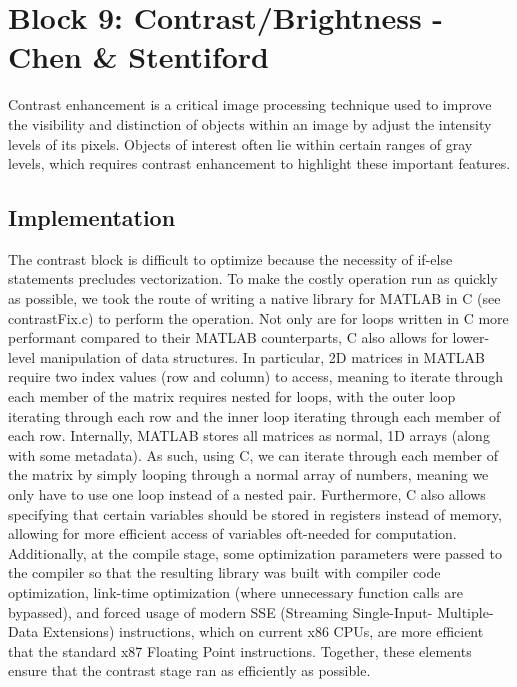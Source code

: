 
\section{Block 9: Contrast/Brightness - Chen \& Stentiford}

Contrast enhancement is a critical image processing technique used to improve the visibility and
distinction of objects within an image by adjust the intensity levels of its pixels. Objects of
interest often lie within certain ranges of gray levels, which requires contrast enhancement to
highlight these important features.


\subsection{Implementation}

The contrast block is difficult to optimize because the necessity of if-else statements precludes 
vectorization. To make the costly operation run as quickly as possible, we took the route of 
writing a native library for MATLAB in C (see contrastFix.c) to perform the operation. Not only 
are for loops written in C more performant compared to their MATLAB counterparts, C also allows 
for lower-level manipulation of data structures. In particular, 2D matrices in MATLAB require 
two index values (row and column) to access, meaning to iterate through each member of the matrix 
requires nested for loops, with the outer loop iterating through each row and the inner loop 
iterating through each member of each row. Internally, MATLAB stores all matrices as normal, 1D 
arrays (along with some metadata). As such, using C, we can iterate through each member of the matrix 
by simply looping through a normal array of numbers, meaning we only have to use one loop instead 
of a nested pair. Furthermore, C also allows specifying that certain variables should be stored in 
registers instead of memory, allowing for more efficient access of variables oft-needed for computation. 
Additionally, at the compile stage, some optimization parameters were passed to the compiler so that 
the resulting library was built with compiler code optimization, link-time optimization (where 
unnecessary function calls are bypassed), and forced usage of modern SSE (Streaming Single-Input-
Multiple-Data Extensions) instructions, which on current x86 CPUs, are more efficient that the 
standard x87 Floating Point instructions. Together, these elements ensure that the contrast stage 
ran as efficiently as possible.